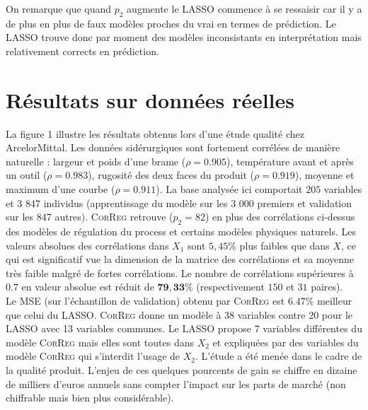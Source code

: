 \documentclass[12pt]{article}
\begin{document}
On remarque que quand $p_2$ augmente le LASSO commence à se ressaisir car il y a de plus en plus de faux modèles proches du vrai en termes de prédiction. Le LASSO trouve donc par moment des modèles inconsistants en interprétation mais relativement corrects en prédiction. %
\section{Résultats sur données réelles}\label{secresrel}
La figure 1 illustre les résultats obtenus lors d'une étude qualité chez ArcelorMittal.  Les données sidérurgiques sont fortement corrélées de manière naturelle : largeur et poids d'une brame ($\rho=0.905$), température avant et après un outil ($\rho=0.983$), rugosité des deux faces du produit ($\rho=0.919$), moyenne et maximum d'une courbe ($\rho=0.911$). La base analysée ici comportait $205$ variables et 3 847 individus (apprentissage du modèle sur les 3 000 premiers et validation sur les 847 autres).
%
\textsc{CorReg} retrouve ($p_2=82$) en plus des corrélations ci-dessus des modèles de régulation du process et certains modèles physiques naturels. Les valeurs absolues des corrélations dans $X_1$ sont $5,45\%$ plus faibles que dans $X$, ce qui est significatif vue la dimension de la matrice des corrélations et sa moyenne très faible malgré de fortes corrélations. Le nombre de corrélations supérieures à $0.7$ en valeur absolue est réduit de $\mathbf{79,33\%}$ (respectivement $150$ et $31$ paires).
\\
		Le MSE (sur l'échantillon de validation) obtenu par \textsc{CorReg} est $\mathbf{6.47\%}$ meilleur que celui du LASSO.  \textsc{CorReg} donne un modèle à 38 variables contre 20 pour le LASSO avec 13 variables communes. Le LASSO propose 7 variables différentes du modèle  \textsc{CorReg} mais elles sont toutes dans $X_2$ et expliquées par des variables du modèle  \textsc{CorReg} qui s'interdit l'usage de $X_2$.
		 L'étude a été menée dans le cadre de la qualité produit. L'enjeu de ces quelques pourcents de gain se chiffre en dizaine de milliers d'euros annuels sans compter l'impact sur les parts de marché (non chiffrable mais bien plus considérable).
	
\end{document}
